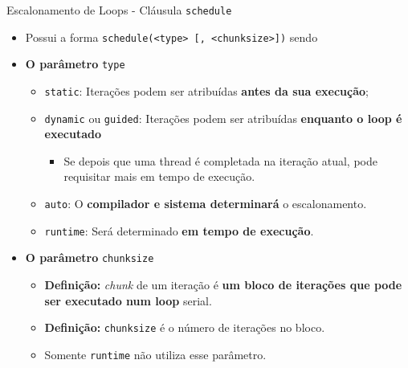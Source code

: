 	\begin{frame}{Escalonamento de Loops - Cláusula {\tt schedule}}
		\begin{itemize}
			\setlength\itemsep{1em}
			\item Possui a forma {\tt schedule(<type> [, <chunksize>])} sendo
			\item \textbf{O parâmetro }{\tt type}
			\begin{itemize}
				\setlength\itemsep{0.4em}
				\item {\tt static}: Iterações podem ser atribuídas \textbf{antes da sua execução};
				\item {\tt dynamic} ou {\tt guided}: Iterações podem ser atribuídas \textbf{enquanto o loop é executado}
				\begin{itemize}
					\item Se depois que uma thread é completada na iteração atual, pode requisitar mais em tempo de execução.
				\end{itemize}

				\item {\tt auto}: O \textbf{compilador e sistema determinará} o escalonamento.
				\item {\tt runtime}: Será determinado \textbf{em tempo de execução}.
			\end{itemize}

					\pause
			\item \textbf{O parâmetro} {\tt chunksize}
			\begin{itemize}
				\setlength\itemsep{0.4em}
				\item \textbf{Definição:} \textit{chunk} de um iteração é \textbf{um bloco de iterações que pode ser executado num loop} serial.
				\item \textbf{Definição:} {\tt chunksize} é o número de iterações no bloco.
				\item Somente {\tt runtime} não utiliza esse parâmetro.
			\end{itemize}
		\end{itemize}
	\end{frame}

